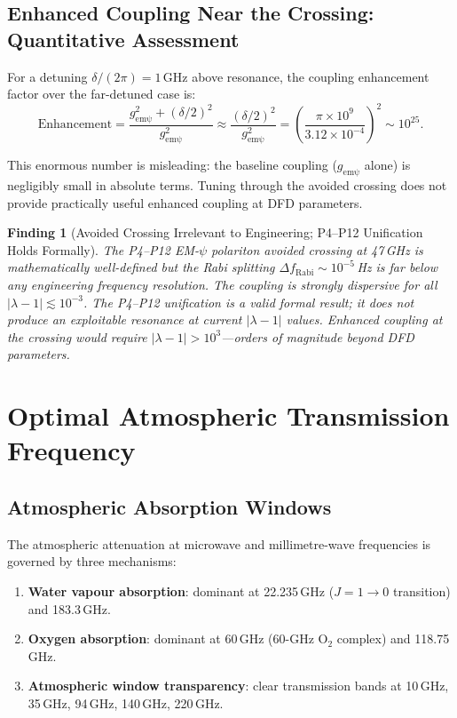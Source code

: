 \documentclass[aps,prd,twocolumn,superscriptaddress]{revtex4-2}
\newtheorem{finding}{Finding}
\begin{document}
\subsection{Enhanced Coupling Near the Crossing: Quantitative Assessment}

For a detuning $\delta/(2\pi) = 1$\,GHz above resonance, the coupling
enhancement factor over the far-detuned case is:
\begin{equation}
\mathrm{Enhancement} = \frac{g_\mathrm{em\psi}^2 + (\delta/2)^2}{g_\mathrm{em\psi}^2}
\approx \frac{(\delta/2)^2}{g_\mathrm{em\psi}^2}
= \left(\frac{\pi\times10^9}{3.12\times10^{-4}}\right)^2
\sim 10^{25}.
\label{eq:enhancement}
\end{equation}

This enormous number is misleading: the baseline coupling ($g_\mathrm{em\psi}$
alone) is negligibly small in absolute terms.  Tuning through the
avoided crossing does not provide practically useful enhanced coupling
at DFD parameters.

\begin{finding}[Avoided Crossing Irrelevant to Engineering; P4--P12 Unification Holds Formally]
The P4--P12 EM-$\psi$ polariton avoided crossing at 47\,GHz is
mathematically well-defined but the Rabi splitting $\Delta f_\mathrm{Rabi}
\sim 10^{-5}$\,Hz is far below any engineering frequency resolution.
The coupling is strongly dispersive for all $|\lambda-1| \lesssim 10^{-3}$.
The P4--P12 unification is a valid formal result; it does not produce
an exploitable resonance at current $|\lambda-1|$ values.  Enhanced
coupling at the crossing would require $|\lambda-1| > 10^3$---orders
of magnitude beyond DFD parameters.
\end{finding}

\section{Optimal Atmospheric Transmission Frequency}
\label{sec:atmosphere}

\subsection{Atmospheric Absorption Windows}

The atmospheric attenuation at microwave and millimetre-wave frequencies
is governed by three mechanisms:
\begin{enumerate}
\item \textbf{Water vapour absorption}: dominant at 22.235\,GHz ($J = 1\to0$
transition) and 183.3\,GHz.
\item \textbf{Oxygen absorption}: dominant at 60\,GHz (60-GHz O$_2$ complex)
and 118.75\,GHz.
\item \textbf{Atmospheric window transparency}: clear transmission bands
at 10\,GHz, 35\,GHz, 94\,GHz, 140\,GHz, 220\,GHz.
\end{enumerate}
\end{document}
